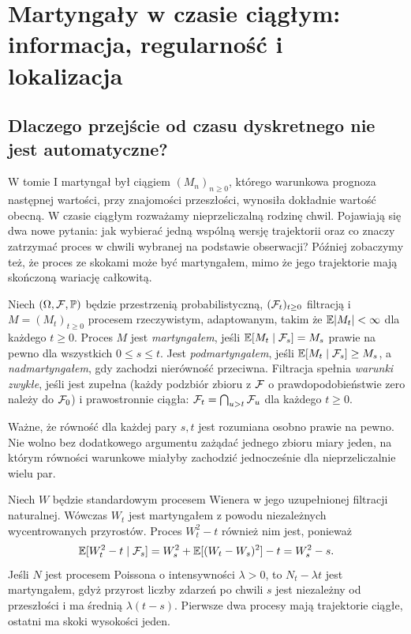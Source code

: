 \chapter{Martyngały w czasie ciągłym: informacja, regularność i lokalizacja}
\label{ch:mart-cont}

\section{Dlaczego przejście od czasu dyskretnego nie jest automatyczne?}
W tomie I martyngał był ciągiem $(M_n)_{n\ge0}$, którego
warunkowa prognoza następnej wartości, przy znajomości przeszłości,
wynosiła dokładnie wartość obecną. W czasie ciągłym rozważamy
nieprzeliczalną rodzinę chwil. Pojawiają się dwa nowe pytania:
jak wybierać jedną wspólną wersję trajektorii oraz co znaczy
zatrzymać proces w chwili wybranej na podstawie obserwacji?
Później zobaczymy też, że proces ze skokami może być martyngałem,
mimo że jego trajektorie mają skończoną wariację całkowitą.

\begin{definicja}
Niech $(\Omega,\mathcal{F},\mathbb{P})$ będzie przestrzenią probabilistyczną,
$(\mathcal{F}_t)_{t\ge0}$ filtracją i $M=(M_t)_{t\ge0}$ procesem
rzeczywistym, adaptowanym, takim że $\mathbb{E}|M_t|<\infty$
dla każdego $t\ge0$. Proces $M$ jest \emph{martyngałem}, jeśli
$\mathbb{E}[M_t\mid\mathcal{F}_s]=M_s$ prawie na pewno dla wszystkich
$0\le s\le t$. Jest \emph{podmartyngałem}, jeśli
$\mathbb{E}[M_t\mid\mathcal{F}_s]\ge M_s$, a \emph{nadmartyngałem},
gdy zachodzi nierówność przeciwna. Filtracja spełnia
\emph{warunki zwykłe}, jeśli jest zupełna (każdy podzbiór zbioru z $\mathcal{F}$ o prawdopodobieństwie
zero należy do $\mathcal{F}_0$) i prawostronnie ciągła:
$\mathcal{F}_t=\bigcap_{u>t}\mathcal{F}_u$ dla każdego $t\ge0$.
\end{definicja}

Ważne, że równość dla każdej pary $s,t$ jest rozumiana osobno
prawie na pewno. Nie wolno bez dodatkowego argumentu zażądać
jednego zbioru miary jeden, na którym równości warunkowe
miałyby zachodzić jednocześnie dla nieprzeliczalnie wielu par.

\begin{przyklad}
Niech $W$ będzie standardowym procesem Wienera w jego
uzupełnionej filtracji naturalnej. Wówczas
$W_t$ jest martyngałem z powodu niezależnych wycentrowanych
przyrostów. Proces $W_t^2-t$ również nim jest, ponieważ
\[
\mathbb{E}[W_t^2-t\mid\mathcal{F}_s]
=W_s^2+\mathbb{E}[(W_t-W_s)^2]-t=W_s^2-s.
\]
Jeśli $N$ jest procesem Poissona o intensywności $\lambda>0$,
to $N_t-\lambda t$ jest martyngałem, gdyż przyrost liczby
zdarzeń po chwili $s$ jest niezależny od przeszłości i ma
średnią $\lambda(t-s)$. Pierwsze dwa procesy mają trajektorie
ciągłe, ostatni ma skoki wysokości jeden.
\end{przyklad}

